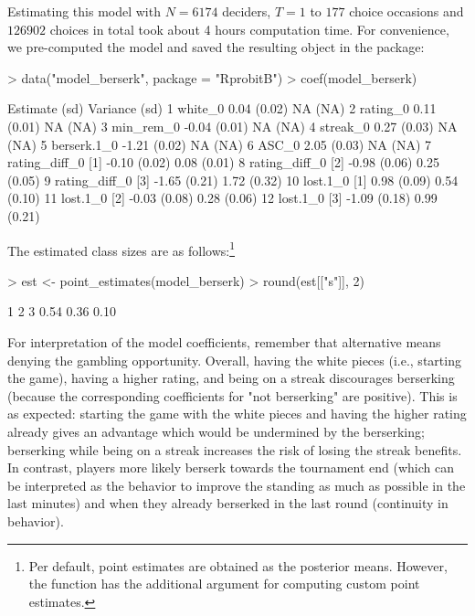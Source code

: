 \documentclass[article,shortnames]{jss}
\newcommand{\fct}[1]{\code{#1()}}
\begin{document}
Estimating this model with $N = 6174$ deciders, $T = 1$ to $177$ choice occasions and $126902$ choices in total took about 4 hours computation time. For convenience, we pre-computed the model and saved the resulting  object in the package:

\begin{Schunk}
\begin{Sinput}
> data("model_berserk", package = "RprobitB")
> coef(model_berserk)
\end{Sinput}
\begin{Soutput}
                     Estimate   (sd) Variance   (sd)
1           white_0      0.04 (0.02)       NA   (NA)
2          rating_0      0.11 (0.01)       NA   (NA)
3         min_rem_0     -0.04 (0.01)       NA   (NA)
4          streak_0      0.27 (0.03)       NA   (NA)
5       berserk.1_0     -1.21 (0.02)       NA   (NA)
6             ASC_0      2.05 (0.03)       NA   (NA)
7  rating_diff_0 [1]    -0.10 (0.02)     0.08 (0.01)
8  rating_diff_0 [2]    -0.98 (0.06)     0.25 (0.05)
9  rating_diff_0 [3]    -1.65 (0.21)     1.72 (0.32)
10      lost.1_0 [1]     0.98 (0.09)     0.54 (0.10)
11      lost.1_0 [2]    -0.03 (0.08)     0.28 (0.06)
12      lost.1_0 [3]    -1.09 (0.18)     0.99 (0.21)
\end{Soutput}
\end{Schunk}

The estimated class sizes are as follows:\footnote{Per default, point estimates are obtained as the posterior means. However, the \fct{point\_estimates} function has the additional  argument for computing custom point estimates.}

\begin{Schunk}
\begin{Sinput}
> est <- point_estimates(model_berserk)
> round(est[["s"]], 2)
\end{Sinput}
\begin{Soutput}
   1    2    3 
0.54 0.36 0.10 
\end{Soutput}
\end{Schunk}

For interpretation of the model coefficients, remember that alternative  means denying the gambling opportunity. Overall, having the white pieces (i.e., starting the game), having a higher rating, and being on a streak discourages berserking (because the corresponding coefficients for "not berserking" are positive). This is as expected: starting the game with the white pieces and having the higher rating already gives an advantage which would be undermined by the berserking; berserking while being on a streak increases the risk of losing the streak benefits. In contrast, players more likely berserk towards the tournament end (which can be interpreted as the behavior to improve the standing as much as possible in the last minutes) and when they already berserked in the last round (continuity in behavior).
\end{document}
